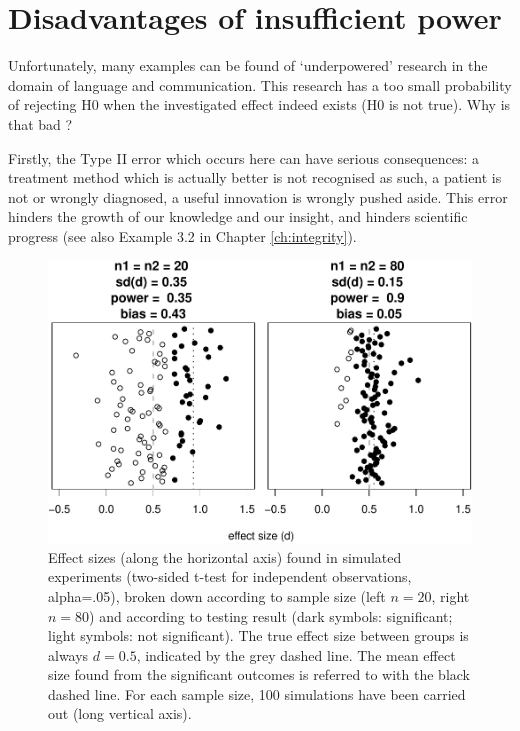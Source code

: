 \documentclass[
]{book}
\begin{document}
\hypertarget{disadvantages-of-insufficient-power}{%
\section{Disadvantages of insufficient power}\label{disadvantages-of-insufficient-power}}

Unfortunately, many examples can be found of `underpowered' research
in the domain of language and communication. This research has a too small
probability of rejecting H0 when the investigated effect indeed
exists (H0 is not true). Why is that bad \citep{Quene10}?

Firstly, the Type II error which occurs here can have serious consequences:
a treatment method which is actually better is not recognised as such,
a patient is not or wrongly diagnosed, a useful innovation is wrongly pushed
aside. This error hinders the growth of our knowledge and our insight, and hinders
scientific progress (see also
Example 3.2 in Chapter \ref{ch:integrity}).

\begin{figure}
\centering
\includegraphics{QMS-EN_files/figure-latex/underpoweredeffectsizes-1.pdf}
\caption{\label{fig:underpoweredeffectsizes}Effect sizes (along the horizontal axis) found in simulated experiments (two-sided t-test for independent observations, alpha=.05), broken down according to sample size (left \(n=20\), right \(n=80\)) and according to testing result (dark symbols: significant; light symbols: not significant). The true effect size between groups is always \(d=0.5\), indicated by the grey dashed line. The mean effect size found from the significant outcomes is referred to with the black dashed line. For each sample size, 100 simulations have been carried out (long vertical axis).}
\end{figure}
\end{document}
